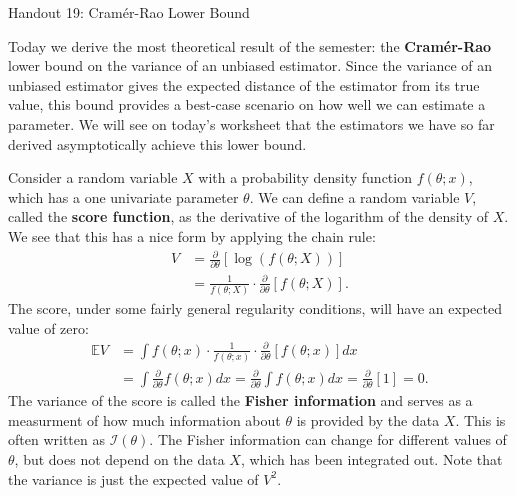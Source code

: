 \documentclass{tufte-handout}
\begin{document}
\justify

{\LARGE Handout 19: Cramér-Rao Lower Bound}

\vspace*{18pt}

\noindent
Today we derive the most theoretical result of the semester: the
\textbf{Cramér-Rao} lower bound on the variance of an
unbiased estimator. Since the variance of an unbiased estimator
gives the expected distance of the estimator from its true value,
this bound provides a best-case scenario on how well we can estimate
a parameter. We will see on today's worksheet that the estimators we
have so far derived asymptotically achieve this lower bound.

Consider a random variable $X$ with a probability density function 
$f(\theta; x)$, which has a one univariate parameter $\theta$. We
can define a random variable $V$, called the \textbf{score function},
as the derivative of the logarithm of the density of $X$.
We see that this has a nice form by applying the chain rule:
\begin{align*}
V &= \frac{\partial}{\partial \theta} \left[ \log(f(\theta; X)) \right] \\
&= \frac{1}{f(\theta; X)} \cdot \frac{\partial}{\partial \theta} \left[ f(\theta; X) \right].
\end{align*}
The score, under some fairly general regularity conditions, will have an
expected value of zero:
\begin{align*}
\mathbb{E} V &= \int f(\theta; x) \cdot \frac{1}{f(\theta; x)} \cdot \frac{\partial}{\partial \theta} \left[ f(\theta; x) \right] dx \\
&= \int \frac{\partial}{\partial \theta} f(\theta; x) dx =
\frac{\partial}{\partial \theta} \int f(\theta; x) dx = \frac{\partial}{\partial \theta} \left[1\right] = 0.
\end{align*}
The variance of the score is called the \textbf{Fisher information}
and serves as a measurment of how much information about $\theta$ is
provided by the data $X$. This is often written as $\mathcal{I}(\theta)$.
The Fisher information can change for different values of $\theta$, but
does not depend on the data $X$, which has been integrated out. Note
that the variance is just the expected value of $V^2$. 
\end{document}
